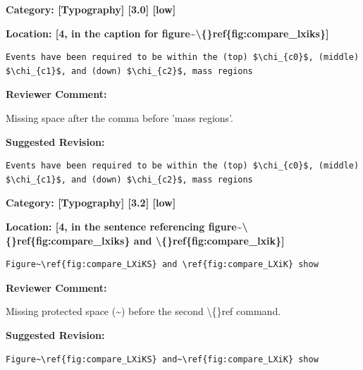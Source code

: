 \documentclass[12pt]{article}
\begin{document}
\begin{reviewer}
\noindent \textbf{Category: [Typography] [3.0] [low]}

\noindent \textbf{Location: [4, in the caption for figure\textasciitilde{}\textbackslash\{\}ref\{fig:compare\_lxiks\}]}

\begin{lstlisting}[breaklines=true]
	Events have been required to be within the (top) $\chi_{c0}$, (middle) $\chi_{c1}$, and (down) $\chi_{c2}$, mass regions
\end{lstlisting}

\textbf{Reviewer Comment:}

Missing space after the comma before 'mass regions'.

\textbf{Suggested Revision:}

\begin{lstlisting}[breaklines=true]
	Events have been required to be within the (top) $\chi_{c0}$, (middle) $\chi_{c1}$, and (down) $\chi_{c2}$, mass regions
\end{lstlisting}

\end{reviewer}

\begin{reviewer}
\noindent \textbf{Category: [Typography] [3.2] [low]}

\noindent \textbf{Location: [4, in the sentence referencing figure\textasciitilde{}\textbackslash\{\}ref\{fig:compare\_lxiks\} and \textbackslash\{\}ref\{fig:compare\_lxik\}]}

\begin{lstlisting}[breaklines=true]
	Figure~\ref{fig:compare_LXiKS} and \ref{fig:compare_LXiK} show
\end{lstlisting}

\textbf{Reviewer Comment:}

Missing protected space (\textasciitilde{}) before the second \textbackslash\{\}ref command.

\textbf{Suggested Revision:}

\begin{lstlisting}[breaklines=true]
	Figure~\ref{fig:compare_LXiKS} and~\ref{fig:compare_LXiK} show
\end{lstlisting}

\end{reviewer}
\end{document}
